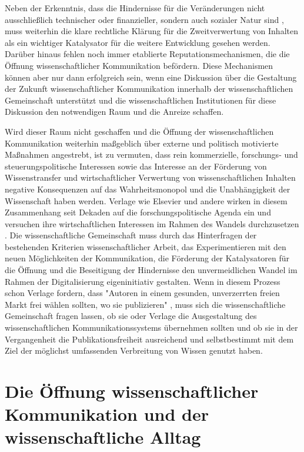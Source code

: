 Neben der Erkenntnis, dass die Hindernisse für die Veränderungen nicht ausschließlich technischer oder finanzieller, sondern auch sozialer Natur sind \cite{Nosek_2012}, muss weiterhin die klare rechtliche Klärung für die Zweitverwertung von Inhalten als ein wichtiger Katalysator für die weitere Entwicklung gesehen werden. Darüber hinaus fehlen noch immer etablierte Reputationsmechanismen, die die Öffnung wissenschaftlicher Kommunikation befördern. Diese Mechanismen können aber nur dann erfolgreich sein, wenn eine Diskussion über die Gestaltung der Zukunft wissenschaftlicher Kommunikation innerhalb der wissenschaftlichen Gemeinschaft unterstützt und die wissenschaftlichen Institutionen für diese Diskussion den notwendigen Raum und die Anreize schaffen.

Wird dieser Raum nicht geschaffen und die Öffnung der wissenschaftlichen Kommunikation weiterhin maßgeblich über externe und politisch motivierte Maßnahmen angestrebt, ist zu vermuten, dass rein kommerzielle, forschungs- und steuerungspolitische Interessen sowie das Interesse an der Förderung von Wissenstransfer und wirtschaftlicher Verwertung von wissenschaftlichen Inhalten negative Konsequenzen auf das Wahrheitsmonopol und die Unabhängigkeit der Wissenschaft haben werden. Verlage wie Elsevier und andere wirken in diesem Zusammenhang seit Dekaden auf die forschungspolitische Agenda ein und versuchen ihre wirtschaftlichen Interessen im Rahmen des Wandels durchzusetzen \cite[:15]{Hirschi_2015} \cite{Elsevier_2012}. Die wissenschaftliche Gemeinschaft muss durch das Hinterfragen der bestehenden Kriterien wissenschaftlicher Arbeit, das Experimentieren mit den neuen Möglichkeiten der Kommunikation, die Förderung der Katalysatoren für die Öffnung und die Beseitigung der Hindernisse den unvermeidlichen Wandel im Rahmen der Digitalisierung eigeninitiativ gestalten. Wenn in diesem Prozess schon Verlage fordern, dass "Autoren in einem gesunden, unverzerrten freien Markt frei wählen sollten, wo sie publizieren" \cite{Brussels_Declaration_2007}, muss sich die wissenschaftliche Gemeinschaft fragen lassen, ob sie oder Verlage die Ausgestaltung des wissenschaftlichen Kommunikationssystems übernehmen sollten und ob sie in der Vergangenheit die Publikationsfreiheit ausreichend und selbstbestimmt mit dem Ziel der möglichst umfassenden Verbreitung von Wissen genutzt haben.

\section{Die Öffnung wissenschaftlicher Kommunikation und der wissenschaftliche Alltag}

